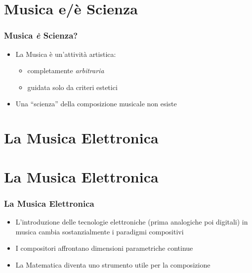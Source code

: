 \documentclass[mode=\printmode,compress,xcolor=dvipsnames]{beamer}
\begin{document}
\section{Musica e/\`e Scienza}

\begin{frame}
   \frametitle<+->{Musica \emph{\`e} Scienza?}

   \begin{itemize}[<+->]
      \item La Musica \`e un'attivit\`a artistica:
        \begin{itemize}[<+->]
           \item completamente \emph{arbitraria}
           \item guidata solo da criteri estetici
        \end{itemize}
     \item Una ``scienza'' della composizione musicale non esiste
   \end{itemize}


\end{frame}

\section{La Musica Elettronica}

\begin{frame}
\end{frame}

\section{La Musica Elettronica}

\begin{frame}
   \frametitle<+->{La Musica Elettronica}

   \begin{itemize}[<+->]

      \item L'introduzione delle tecnologie elettroniche (prima analogiche poi
              digitali) in musica cambia sostanzialmente i paradigmi
              compositivi

      \item I compositori affrontano dimensioni parametriche continue

      \item La Matematica diventa uno strumento utile per la composizione

   \end{itemize}


\end{frame}
\end{document}

